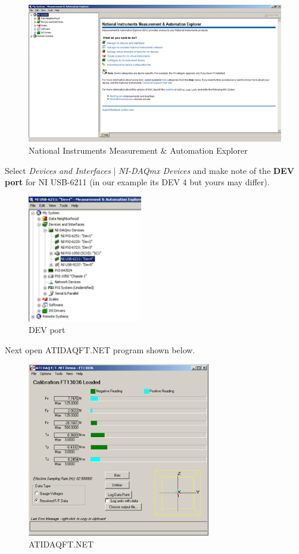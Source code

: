 \documentclass[pdftex,11pt,letterpaper]{article}
\begin{document}
\begin{figure}[ht!]
\centering
\includegraphics[width=150mm]{./images/ni_ma}
\caption{National Instruments Measurement \& Automation Explorer}
\end{figure}

Select \textit{Devices and Interfaces} | \textit{NI-DAQmx Devices} and make note of the \textbf{DEV port} for NI USB-6211 (in our example its DEV 4 but yours may differ). \\ 

\begin{figure}[ht!]
\centering
\includegraphics[width=50mm]{./images/dev4}
\caption{DEV port}
\end{figure}

\pagebreak

Next open ATIDAQFT.NET program shown below. 

\begin{figure}[h!]
\centering
\includegraphics[width=80mm]{./images/cal}
\caption{ATIDAQFT.NET}
\end{figure}
\end{document}
